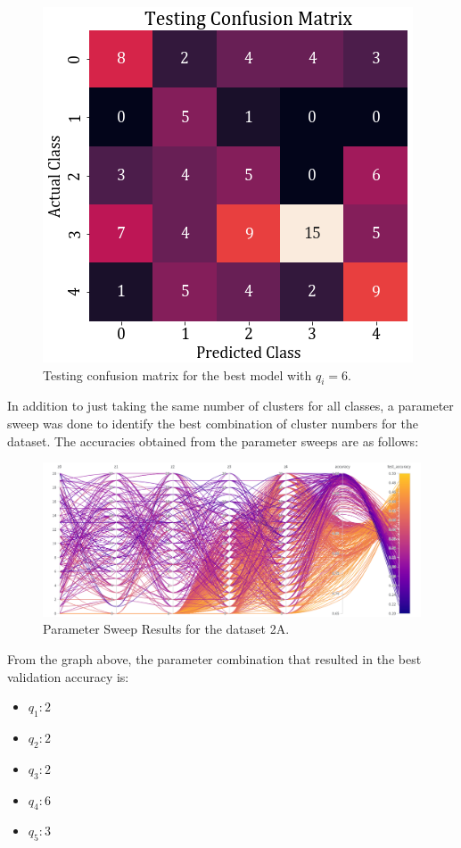 \documentclass[11pt,a4paper]{article}
\newcommand{\noi}{\noindent}
\begin{document}
\begin{figure}[H]
    \centering
    \includegraphics[scale=0.5]{images/2A/2a_full_test_conf.png}
    \caption{Testing confusion matrix for the best model with $q_i=6$.}
\end{figure}

\noi
In addition to just taking the same number of clusters for all classes, a parameter sweep was done to identify the best combination of cluster numbers for the dataset. The accuracies obtained from the parameter sweeps are as follows:
\begin{figure}[H]
    \centering
    \includegraphics[scale=0.35]{images/2A/2a_parameter_sweep.png}
    \caption{Parameter Sweep Results for the dataset 2A.}
\end{figure}

\noi
From the graph above, the parameter combination that resulted in the best validation accuracy is:
\begin{itemize}
    \itemsep0em
    \item $q_1: 2$
    \item $q_2: 2$
    \item $q_3: 2$
    \item $q_4: 6$
    \item $q_5: 3$
\end{itemize}
\end{document}
